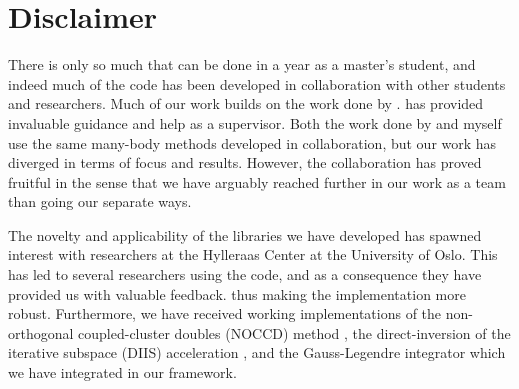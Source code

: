     \section{Disclaimer}
        There is only so much that can be done in a year as a master's student,
        and indeed much of the code has been developed in collaboration with
        other students and researchers.
        Much of our work builds on the work done by
        \citeauthor{kristiansen2017time} \cite{kristiansen2017time}.
        \citeauthor{kristiansen2017time} has provided invaluable guidance and
        help as a supervisor.
        Both the work done by \citeauthor{greg-winther} \cite{greg-winther} and
        myself use the same many-body methods developed in collaboration, but
        our work has diverged in terms of focus and results.
        However, the collaboration has proved fruitful in the sense that we have
        arguably reached further in our work as a team than going our separate
        ways.

        The novelty and applicability of the libraries we have developed has
        spawned interest with researchers at the Hylleraas Center at the
        University of Oslo.
        This has led to several researchers using the code, and as a consequence
        they have provided us with valuable feedback.
        thus making the implementation more robust.
        Furthermore, we have received working implementations of the
        non-orthogonal coupled-cluster doubles (NOCCD) method \cite{rolf-nocc},
        the direct-inversion of the iterative subspace (DIIS) acceleration
        \cite{rolf-nocc}, and the Gauss-Legendre \cite{pedersen2018symplectic}
        integrator which we have integrated in our framework.
